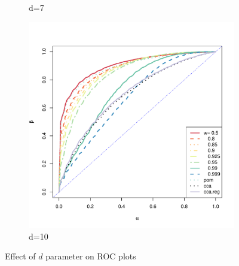 \documentclass[11pt]{article} %
\begin{document}
\begin{figure}
\begin{subfigure}[b]{0.47\textwidth}
                \caption{d=7}
                \label{fig:ROC-d-7}
        \end{subfigure}          
               \begin{subfigure}[b]{0.47\textwidth}
                \centering
               \includegraphics[width=\textwidth]{ROC-d-10.pdf}
                \caption{d=10}
                \label{fig:ROC-d-10}
        \end{subfigure}
         
        \caption{Effect of $d$ parameter on ROC plots}\label{fig:ROC-d}
        \label{fig:ROC-d}

\end{figure}
\end{document}
